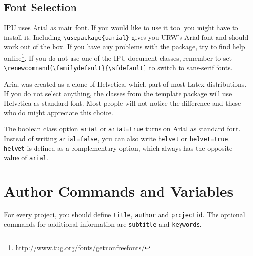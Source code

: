 \documentclass[short,comm]{ipureport}
\begin{document}
\subsection{Font Selection}
IPU uses Arial as main font. If you would like to use it too, you might have to install it. Including \texttt{\textbackslash{}usepackage\{uarial\}} gives you URW's Arial font and should work out of the box. If you have any problems with the package, try to find help online\footnote{\url{http://www.tug.org/fonts/getnonfreefonts/}}. If you do not use one of the IPU document classes, remember to set \texttt{\textbackslash{}renewcommand\{\textbackslash{}familydefault\}\{\textbackslash{}sfdefault\}} to switch to sans-serif fonts. 

Arial was created as a clone of Helvetica, which part of most Latex distributions. If you do not select anything, the classes from the template package will use Helvetica as standard font. Most people will not notice the difference and those who do might appreciate this choice. 

The boolean class option \texttt{arial} or \texttt{arial=true} turns on Arial as standard font. Instead of writing \texttt{arial=false}, you can also write \texttt{helvet} or \texttt{helvet=true}. \texttt{helvet} is defined as a complementary option, which always has the opposite value of \texttt{arial}. 

%
%
%
\section{Author Commands and Variables}

For every project, you should define \texttt{title}, \texttt{author} and \texttt{projectid}. The optional 
commands for additional information are \texttt{subtitle} and \texttt{keywords}. 



\blinddocument
{}
\blindmathpaper

\end{document}
